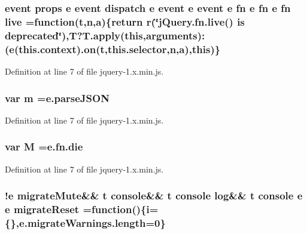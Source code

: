 \subsubsection[{\texorpdfstring{live}{live}}]{ event props {\bf e} event dispatch {\bf e} event {\bf e} event {\bf e} {\bf fn} {\bf e} {\bf fn} {\bf e} {\bf fn} live =function({\bf t},{\bf n},{\bf a})\{return r(\char`\"{}j\+Query.\+fn.\+live() is deprecated\char`\"{}),T?T.\+apply({\bf this},arguments)\+:({\bf e}(this.\+context).{\bf on}({\bf t},this.\+selector,{\bf n},{\bf a}),{\bf this})\}}\hypertarget{jquery-1_8x_8min_8js_aa6c79bc1b67b68a78848ce440dbedd68}{}\label{jquery-1_8x_8min_8js_aa6c79bc1b67b68a78848ce440dbedd68}


Definition at line 7 of file jquery-\/1.\+x.\+min.\+js.

\subsubsection[{\texorpdfstring{m}{m}}]{\setlength{\rightskip}{0pt plus 5cm}var m ={\bf e.\+parse\+J\+S\+ON}}\hypertarget{jquery-1_8x_8min_8js_a9e77e016b2928d7dcb493b89a0c9dc32}{}\label{jquery-1_8x_8min_8js_a9e77e016b2928d7dcb493b89a0c9dc32}


Definition at line 7 of file jquery-\/1.\+x.\+min.\+js.

\subsubsection[{\texorpdfstring{M}{M}}]{\setlength{\rightskip}{0pt plus 5cm}var M ={\bf e.\+fn.\+die}}\hypertarget{jquery-1_8x_8min_8js_af33e4fb80081524297d84c89540aeaca}{}\label{jquery-1_8x_8min_8js_af33e4fb80081524297d84c89540aeaca}


Definition at line 7 of file jquery-\/1.\+x.\+min.\+js.

\subsubsection[{\texorpdfstring{migrate\+Reset}{migrateReset}}]{ !{\bf e} migrate\+Mute\&\& {\bf t} console\&\& {\bf t} console {\bf log}\&\& {\bf t} console {\bf e} {\bf e} migrate\+Reset =function()\{{\bf i}=\{\},{\bf e.\+migrate\+Warnings.\+length}=0\}}\hypertarget{jquery-1_8x_8min_8js_ad5132c36e337c6103a95a3d355e6c4a5}{}\label{jquery-1_8x_8min_8js_ad5132c36e337c6103a95a3d355e6c4a5}


